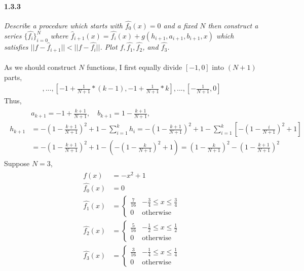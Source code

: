 \documentclass{myhw}
\begin{document}
\begin{homeworkProblem}
\begin{homeworkSection}
\paragraph{1.3.3} 
\emph{Describe a procedure which starts with $\hat{f_0}(x) = 0$ and a fixed $N$ then construct a series $\{\hat{f_i}\}_{i=0}^N$ where $\hat{f}_{i+1}(x) = \hat{f_i}(x) + g(h_{i+1}, a_{i+1}, b_{i+1}, x)$ which satisfies $||f - \hat{f}_{i+1}|| < ||f - \hat{f_i}||$. Plot $f, \hat{f_1}, \hat{f_2}$, and $\hat{f_3}$.} \\
\\
As we should construct $N$ functions, I first equally divide $[-1,0]$ into $(N+1)$ parts, 
\begin{gather*}
[-1, -1 + \frac{1}{N+1}], ..., [-1 + \frac{1}{N+1} * (k-1), -1 + \frac{1}{N+1} * k], ..., [-\frac{1}{N+1}, 0]
\end{gather*}
Thus, 
\begin{gather*}
\begin{aligned}
& a_{k+1} = -1 + \frac{k+1}{N+1} , \quad b_{k+1} = 1 - \frac{k+1}{N+1}, \\ 
h_{k+1} & = - (1-\frac{k+1}{N+1})^2 + 1 - \sum_{i=1}^{k} h_i = - (1-\frac{k+1}{N+1})^2 + 1 - \sum_{i=1}^{k} [- (1-\frac{i}{N+1})^2 + 1] \\
&= - (1-\frac{k+1}{N+1})^2 + 1 - (- (1-\frac{k}{N+1})^2 + 1) = (1-\frac{k}{N+1})^2 - (1-\frac{k+1}{N+1})^2
\end{aligned}
\end{gather*}
Suppose $N = 3$,
\begin{gather*}
\begin{aligned}
f(x) &= - x^2 + 1 \\
\hat{f_0}(x) &= 0 \\
\hat{f_1}(x) &= \begin{cases} \frac{7}{16} & -\frac{3}{4} \leq x \leq \frac{3}{4} \\ 0 & \text{otherwise} \end{cases} \\
\hat{f_2}(x) &= \begin{cases} \frac{5}{16} & -\frac{1}{2} \leq x \leq \frac{1}{2} \\ 0 & \text{otherwise} \end{cases} \\ 
\hat{f_3}(x) &= \begin{cases} \frac{3}{16} & -\frac{1}{4} \leq x \leq \frac{1}{4} \\ 0 & \text{otherwise} \end{cases} \\

\end{aligned}
\end{gather*}
\end{homeworkSection}
\end{homeworkProblem}
\end{document}

